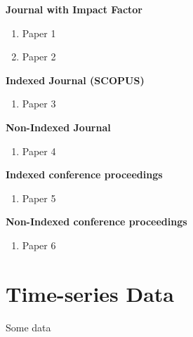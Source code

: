 \documentclass[twoside]{utmthesis}
\begin{document}
\noindent \textbf{Journal with Impact Factor}
\begin{enumerate}
\item Paper 1
\item Paper 2
\end{enumerate}
\textbf{Indexed Journal (SCOPUS)}
\begin{enumerate}
\item Paper 3
\end{enumerate}
\noindent \textbf{Non-Indexed Journal}
\begin{enumerate}
\item Paper 4
\end{enumerate}
\noindent \textbf{Indexed conference proceedings}
\begin{enumerate}
\item Paper 5
\end{enumerate}
\noindent \textbf{Non-Indexed conference proceedings}
\begin{enumerate}
\item Paper 6
\end{enumerate}


\appendix
\chapter{Time-series Data}
Some data

\endmatter
\end{document}
